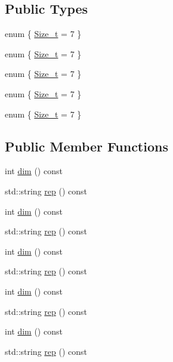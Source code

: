 \subsection*{Public Types}
\begin{DoxyCompactItemize}
\item 
enum \{ \mbox{\hyperlink{structHadron_1_1J3Rep_a4275c4aa9c6e5c218ba69273f2ab0ca0abc2ea108a2c20f2a53588a413ad5d4f7}{Size\+\_\+t}} = 7
 \}
\item 
enum \{ \mbox{\hyperlink{structHadron_1_1J3Rep_a4275c4aa9c6e5c218ba69273f2ab0ca0abc2ea108a2c20f2a53588a413ad5d4f7}{Size\+\_\+t}} = 7
 \}
\item 
enum \{ \mbox{\hyperlink{structHadron_1_1J3Rep_a4275c4aa9c6e5c218ba69273f2ab0ca0abc2ea108a2c20f2a53588a413ad5d4f7}{Size\+\_\+t}} = 7
 \}
\item 
enum \{ \mbox{\hyperlink{structHadron_1_1J3Rep_a4275c4aa9c6e5c218ba69273f2ab0ca0abc2ea108a2c20f2a53588a413ad5d4f7}{Size\+\_\+t}} = 7
 \}
\item 
enum \{ \mbox{\hyperlink{structHadron_1_1J3Rep_a4275c4aa9c6e5c218ba69273f2ab0ca0abc2ea108a2c20f2a53588a413ad5d4f7}{Size\+\_\+t}} = 7
 \}
\end{DoxyCompactItemize}
\subsection*{Public Member Functions}
\begin{DoxyCompactItemize}
\item 
int \mbox{\hyperlink{structHadron_1_1J3Rep_ab2c01ddb7d42f7ce131a9e07f0a6703d}{dim}} () const
\item 
std\+::string \mbox{\hyperlink{structHadron_1_1J3Rep_ab890e5844d6c221d555b2049711e89a6}{rep}} () const
\item 
int \mbox{\hyperlink{structHadron_1_1J3Rep_ab2c01ddb7d42f7ce131a9e07f0a6703d}{dim}} () const
\item 
std\+::string \mbox{\hyperlink{structHadron_1_1J3Rep_ab890e5844d6c221d555b2049711e89a6}{rep}} () const
\item 
int \mbox{\hyperlink{structHadron_1_1J3Rep_ab2c01ddb7d42f7ce131a9e07f0a6703d}{dim}} () const
\item 
std\+::string \mbox{\hyperlink{structHadron_1_1J3Rep_ab890e5844d6c221d555b2049711e89a6}{rep}} () const
\item 
int \mbox{\hyperlink{structHadron_1_1J3Rep_ab2c01ddb7d42f7ce131a9e07f0a6703d}{dim}} () const
\item 
std\+::string \mbox{\hyperlink{structHadron_1_1J3Rep_ab890e5844d6c221d555b2049711e89a6}{rep}} () const
\item 
int \mbox{\hyperlink{structHadron_1_1J3Rep_ab2c01ddb7d42f7ce131a9e07f0a6703d}{dim}} () const
\item 
std\+::string \mbox{\hyperlink{structHadron_1_1J3Rep_ab890e5844d6c221d555b2049711e89a6}{rep}} () const
\end{DoxyCompactItemize}


